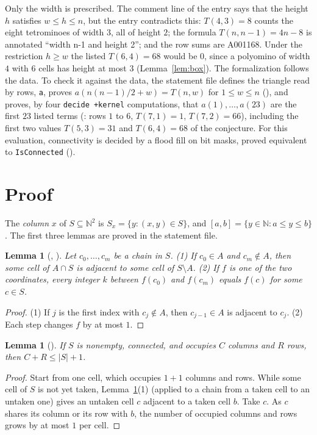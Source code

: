 \documentclass[11pt]{amsart}
\theoremstyle{plain}
\newtheorem{lemma}[theorem]{Lemma}
\theoremstyle{definition}
\newcommand{\code}[1]{\texttt{#1}}
\newcommand{\N}{\mathbb{N}}
\begin{document}
Only the width is prescribed. The comment line of the entry says that the height $h$ satisfies $w\le h\le n$, but the entry contradicts this: $T(4,3)=8$ counts the eight tetrominoes of width $3$, all of height $2$; the formula $T(n,n-1)=4n-8$ is annotated ``width n-1 and height 2''; and the row sums are A001168. Under the restriction $h\ge w$ the listed $T(6,4)=68$ would be $0$, since a polyomino of width $4$ with $6$ cells has height at most $3$ (Lemma~\ref{lem:box}). The formalization follows the data. To check it against the data, the statement file defines the triangle read by rows, \code{a}, proves $a(n(n-1)/2+w)=T(n,w)$ for $1\le w\le n$ (), and proves, by four \texttt{decide +kernel} computations, that $a(1),\dots,a(23)$ are the first $23$ listed terms (: rows $1$ to $6$, $T(7,1)=1$, $T(7,2)=66$), including the first two values $T(5,3)=31$ and $T(6,4)=68$ of the conjecture. For this evaluation, connectivity is decided by a flood fill on bit masks, proved equivalent to \code{IsConnected} ().

\section{Proof}\label{sec:proof}

The \emph{column} $x$ of $S\subseteq\N^2$ is $S_x=\{y:(x,y)\in S\}$, and $[a,b]=\{y\in\N: a\le y\le b\}$. The first three lemmas are proved in the statement file.

\begin{lemma}[, ]\label{lem:chain}
Let $c_0,\dots,c_m$ be a chain in $S$. (1) If $c_0\in A$ and $c_m\notin A$, then some cell of $A\cap S$ is adjacent to some cell of $S\setminus A$. (2) If $f$ is one of the two coordinates, every integer $k$ between $f(c_0)$ and $f(c_m)$ equals $f(c)$ for some $c\in S$.
\end{lemma}

\begin{proof}
(1) If $j$ is the first index with $c_j\notin A$, then $c_{j-1}\in A$ is adjacent to $c_j$. (2) Each step changes $f$ by at most $1$.
\end{proof}

\begin{lemma}[]\label{lem:colsrows}
If $S$ is nonempty, connected, and occupies $C$ columns and $R$ rows, then $C+R\le|S|+1$.
\end{lemma}

\begin{proof}
Start from one cell, which occupies $1+1$ columns and rows. While some cell of $S$ is not yet taken, Lemma~\ref{lem:chain}(1) (applied to a chain from a taken cell to an untaken one) gives an untaken cell $c$ adjacent to a taken cell $b$. Take $c$. As $c$ shares its column or its row with $b$, the number of occupied columns and rows grows by at most $1$ per cell.
\end{proof}
\end{document}

